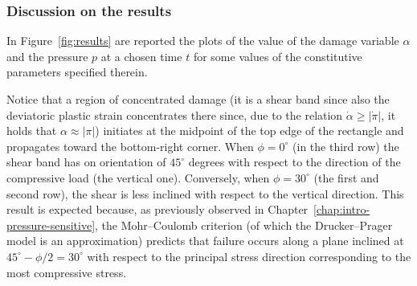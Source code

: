 \documentclass[a4paper,10pt,oneside]{amsbook}
\numberwithin{section}{chapter}
\numberwithin{equation}{chapter}
\theoremstyle{definition}
\begin{document}
\subsubsection*{Discussion on the results}

In Figure~\ref{fig:results} are reported the plots of the value of the damage variable $\alpha$ and the pressure $p$ at a chosen time $t$ for some values of the constitutive parameters specified therein.

Notice that a region of concentrated damage (it is a shear band since also the deviatoric plastic strain concentrates there since, due to the relation $\dot\alpha\ge|\dot\pi|$, it holds that $\alpha\approx|\pi|$) initiates at the midpoint of the top edge of the rectangle and propagates toward the bottom-right corner. When $\phi=0^\circ$ (in the third row) the shear band has on orientation of $45^\circ$ degrees with respect to the direction of the compressive load (the vertical one). Conversely, when $\phi=30^\circ$ (the first and second row), the shear is less inclined with respect to the vertical direction. This result is expected because, as previously observed in Chapter~\ref{chap:intro-pressure-sensitive}, the Mohr–Coulomb criterion (of which the Drucker–Prager model is an approximation) predicts that failure occurs along a plane inclined at $45^\circ-\phi/2=30^\circ$ with respect to the principal stress direction corresponding to the most compressive stress.
\end{document}
